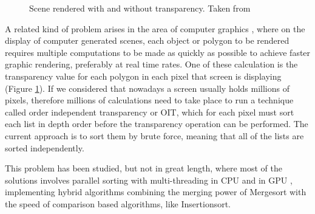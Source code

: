 \documentclass[a4paper,12pt]{article}
\begin{document}
\begin{figure}[H]
\centering
{}
\hfill %
\caption{Scene rendered with and without transparency. Taken from \cite{Arch2015}}
\label{fig:Transp}
\end{figure}

A related kind of problem arises in the area of computer graphics \cite{Arch2015}, where on the display of computer generated scenes, each object or polygon to be rendered requires multiple computations to be made as quickly as possible to achieve faster graphic rendering, preferably at real time rates. One of these calculation is the transparency value for each polygon in each pixel that screen is displaying (Figure \ref{fig:Transp}). If we considered that nowadays a screen usually holds millions of pixels, therefore millions of calculations need to take place to run a technique called order independent transparency or OIT, which for each pixel must sort each list in depth order before the transparency operation can be performed. The current approach is to sort them by brute force, meaning that all of the lists are sorted independently.

This problem has been studied, but not in great length, where most of the solutions involves parallel sorting with multi-threading in CPU \cite{han2002integer} and in GPU \cite{hou2017fast},  implementing hybrid algorithms combining the merging power of Mergesort with the speed of comparison based algorithms, like Insertionsort. 
\\
\end{document}
